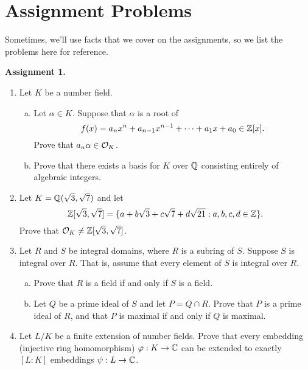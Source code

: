 \appendix 
\section{Assignment Problems}
Sometimes, we'll use facts that we cover on the assignments, 
so we list the problems here for reference. 

{\bf Assignment 1.} 
\begin{enumerate}[leftmargin=1.5cm, label={{\bf A1-\arabic*}}]
    \item \label{A1-1} Let $K$ be a number field. \begin{enumerate}[(a)]
        \item Let $\alpha \in K$. Suppose that $\alpha$ is a root of 
        \[ f(x) = a_n x^n + a_{n-1} x^{n-1} + \cdots + a_1 x + a_0 \in \mathbb{Z}[x]. \] 
        Prove that $a_n \alpha \in {\cal O}_K$. 
        \item Prove that there exists a basis for 
        $K$ over $\mathbb{Q}$ consisting entirely of algebraic integers. 
    \end{enumerate} 
    \item \label{A1-2} Let $K = \mathbb{Q}(\sqrt{3}, \sqrt{7})$ and let 
    \[ \mathbb{Z}[\sqrt{3}, \sqrt{7}] = \{a + b\sqrt{3} + c\sqrt{7} + d\sqrt{21} : 
    a, b, c, d \in \mathbb{Z}\}. \] 
    Prove that ${\cal O}_K \neq \mathbb{Z}[\sqrt{3}, \sqrt{7}]$. 
    \item \label{A1-3} Let $R$ and $S$ be integral domains, where $R$ is a subring of $S$. 
    Suppose $S$ is integral over $R$. That is, assume that every element of 
    $S$ is integral over $R$. 
    \begin{enumerate}[(a)]
        \item Prove that $R$ is a field if and only if $S$ is a field. 
        \item Let $Q$ be a prime ideal of $S$ and let $P = Q \cap R$. 
        Prove that $P$ is a prime ideal of $R$, and that $P$ is maximal 
        if and only if $Q$ is maximal.
    \end{enumerate}
    \item \label{A1-4} Let $L/K$ be a finite extension of number fields. 
    Prove that every embedding (injective ring homomorphism) $\varphi : 
    K \to \mathbb{C}$ can be extended to exactly $[L : K]$ embeddings $\psi : L \to \mathbb{C}$.
\end{enumerate}